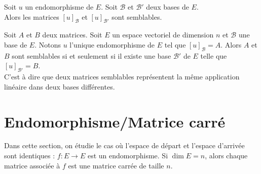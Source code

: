 \documentclass{book}
\begin{document}
\begin{Proposition}
Soit $u$ un endomorphisme de $E$. Soit $\mathcal{B}$ et $\mathcal{B}'$ deux bases de $E$.\\
Alors les matrices $[u]_\mathcal{B}$ et $[u]_{\mathcal{B}'}$ sont semblables.
\end{Proposition}
\begin{Proposition}
Soit $A$ et $B$ deux matrices.
Soit $E$ un espace vectoriel de dimension $n$ et $\mathcal{B}$ une base de $E$.
Notons $u$ l'unique endomorphisme de $E$ tel que $[u]_\mathcal{B} = A$.
Alors $A$ et $B$ sont semblables si et seulement si il existe une base $\mathcal{B}'$ de $E$ telle que $[u]_{\mathcal{B}'} = B$.\\
C'est à dire que deux matrices semblables représentent la même application linéaire dans deux bases différentes.
\end{Proposition}

\section{Endomorphisme/Matrice carré}
Dans cette section, on étudie le cas où l'espace de départ et l'espace d'arrivée sont identiques : $f : E\to E$ est un
endomorphisme. Si $\dim E = n$, alors chaque matrice associée à $f$ est une matrice carrée de taille $n$.
\end{document}
